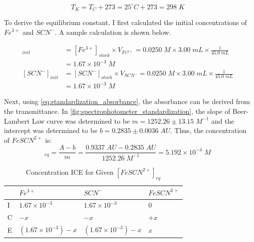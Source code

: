 \begin{equation}
    T_K = T_C+273 = 25^\circ C + 273 = 298 \; K
\end{equation}

\noindent
To derive the equilibrium constant, I first calculated the initial concentrations of \(Fe^{3+}\) and \(SCN^-\). A sample calculation is shown below.

\begin{align}
    [Fe^{3+}]_{init} &= [Fe^{3+}]_{stock} \times V_{Fe^{3+}} = 0.0250 \; M \times 3.00 \; mL \times \frac{1}{45.0 \; mL} \\
    &= 1.67 \times 10^{-3} \; M \\
    [SCN^-]_{init} &= [SCN^-]_{stock} \times V_{SCN^-} = 0.0250 \; M \times 3.00 \; mL \times \frac{1}{45.0 \; mL} \\
    &= 1.67 \times 10^{-3} \; M
\end{align}

\noindent
Next, using \cref{eq:standardization_absorbance}, the absorbance can be derived from the transmittance. In \cref{fig:spectrophotometer_standardization}, the slope of Beer-Lambert Law curve was determined to be \(m=1252.26 \pm 13.15 \; M^{-1}\) and the intercept was determined to be \(b=0.2835 \pm 0.0036 \; AU\). Thus, the concentration of \(FeSCN^{2+}\) is:
\begin{equation}
    [FeSCN^{2+}]_{eq} = \frac{A - b}{m} = \frac{0.9337 \; AU
 - 0.2835 \; AU}{1252.26 \; M^{-1}} = 5.192 \times 10^{-4} \; M
\end{equation}

\begin{table}[H]
\centering
\begin{tabular}{l|ll|l}
  & \(Fe^{3+}\) & \(SCN^-\) & \(FeSCN^{2+}\) \\ \hline
  
I & \(1.67 \times 10^{-3}\)                      & \(1.67 \times 10^{-3}\)
                      & 0                      \\ 
C & \(-x\)                      & \(-x\)                      & \(+x\)                     \\ 
E & \((1.67 \times 10^{-3}) - x\)                      & \((1.67 \times 10^{-3}) - x\)                      & \(x\)                   \\ 
\end{tabular}
\caption{Concentration ICE for Given \([FeSCN^{2+}]_{eq}\)}
\label{table:ice_sample}
\end{table}

